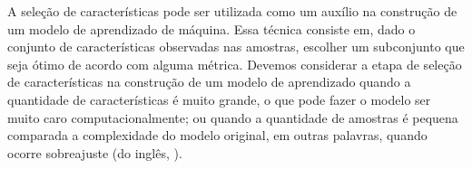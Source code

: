 
A seleção de características pode ser utilizada como um auxílio na
construção de um modelo de aprendizado de máquina. Essa técnica consiste
em, dado o conjunto de características observadas nas amostras, escolher
um subconjunto que seja ótimo de acordo com alguma métrica. Devemos 
considerar a etapa de seleção de características na construção de um 
modelo de aprendizado quando a quantidade de características é muito
grande, o que pode fazer o modelo ser muito caro computacionalmente; ou
quando a quantidade de amostras é pequena comparada a complexidade do 
modelo original, em outras palavras, quando ocorre sobreajuste (do 
inglês, ).
